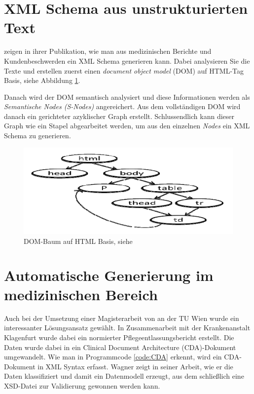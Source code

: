 \section{XML Schema aus unstrukturierten Text}
\textcite{Rajbabu2013} zeigen in ihrer Publikation, wie man aus medizinischen Berichte und Kundenbeschwerden  ein XML Schema generieren kann. Dabei analysieren Sie die Texte und erstellen zuerst einen \emph{document object model} (DOM) auf HTML-Tag Basis, siehe Abbildung \ref{fig:DOMobjects}. 

Danach wird der DOM semantisch analysiert und diese Informationen werden als \emph{Semantische Nodes (S-Nodes)} angereichert. Aus dem vollständigen DOM wird danach ein gerichteter azyklischer Graph erstellt. Schlussendlich kann dieser Graph wie ein Stapel abgearbeitet werden, um aus den einzelnen \emph{Nodes} ein XML Schema zu generieren.

\begin{figure}
    \centering
    \includegraphics[height=0.5\textheight,width=1\textwidth]{images/domNodes.PNG}
    \caption{DOM-Baum auf HTML Basis, siehe \textcite{Rajbabu2013}}
    \label{fig:DOMobjects}
\end{figure}

\section{Automatische Generierung im medizinischen Bereich}
Auch bei der Umsetzung einer Magisterarbeit von \textcite{Wagner2007} an der TU Wien wurde ein interessanter Lösungsansatz gewählt.
In Zusammenarbeit mit der Krankenanstalt Klagenfurt wurde dabei ein normierter Pflegeentlassungsbericht erstellt. Die Daten wurde dabei in ein Clinical Document Architecture (CDA)-Dokument umgewandelt. Wie man in Programmcode \ref{code:CDA} erkennt, wird ein CDA-Dokument in XML Syntax erfasst.
Wagner zeigt in seiner Arbeit, wie er die Daten klassifiziert und damit ein Datenmodell erzeugt, aus dem schließlich eine XSD-Datei zur Validierung gewonnen werden kann.


